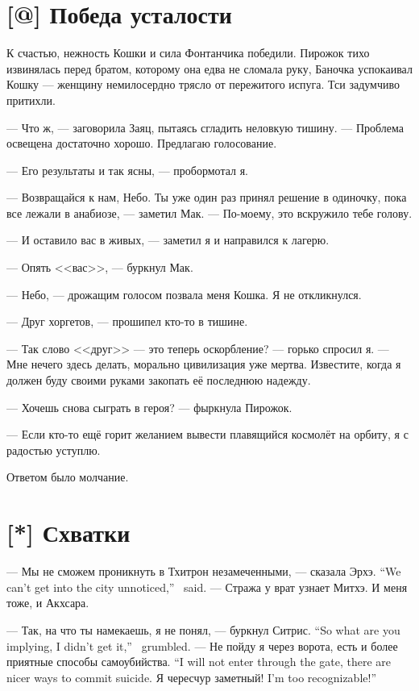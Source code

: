 \section{[@] Победа усталости}

К счастью, нежность Кошки и сила Фонтанчика победили.
Пирожок тихо извинялась перед братом, которому она едва не сломала руку, Баночка успокаивал Кошку --- женщину немилосердно трясло от пережитого испуга.
Тси задумчиво притихли.

--- Что ж, --- заговорила Заяц, пытаясь сгладить неловкую тишину.
--- Проблема освещена достаточно хорошо.
Предлагаю голосование.

--- Его результаты и так ясны, --- пробормотал я.

--- Возвращайся к нам, Небо.
Ты уже один раз принял решение в одиночку, пока все лежали в анабиозе, --- заметил Мак.
--- По-моему, это вскружило тебе голову.

--- И оставило вас в живых, --- заметил я и направился к лагерю.

--- Опять <<вас>>, --- буркнул Мак.

--- Небо, --- дрожащим голосом позвала меня Кошка.
Я не откликнулся.

--- Друг хоргетов, --- прошипел кто-то в тишине.

--- Так слово <<друг>> --- это теперь оскорбление? --- горько спросил я.
--- Мне нечего здесь делать, морально цивилизация уже мертва.
Известите, когда я должен буду своими руками закопать её последнюю надежду.

--- Хочешь снова сыграть в героя? --- фыркнула Пирожок.

--- Если кто-то ещё горит желанием вывести плавящийся космолёт на орбиту, я с радостью уступлю.

Ответом было молчание.

\section{[*] Схватки}

\textspace

{--- Мы не сможем проникнуть в Тхитрон незамеченными, --- сказала Эрхэ.}
{``We can't get into the city unnoticed,'' \Oerchoe\ said.}
--- Стража у врат узнает Митхэ.
И меня тоже, и Акхсара.

{--- Так, на что ты намекаешь, я не понял, --- буркнул Ситрис.}
{``So what are you implying, I didn't get it,'' \Sitris\ grumbled.}
{--- Не пойду я через ворота, есть и более приятные способы самоубийства.}
{``I will not enter through the gate, there are nicer ways to commit suicide.}
{Я чересчур заметный!}
{I'm too recognizable!''}

